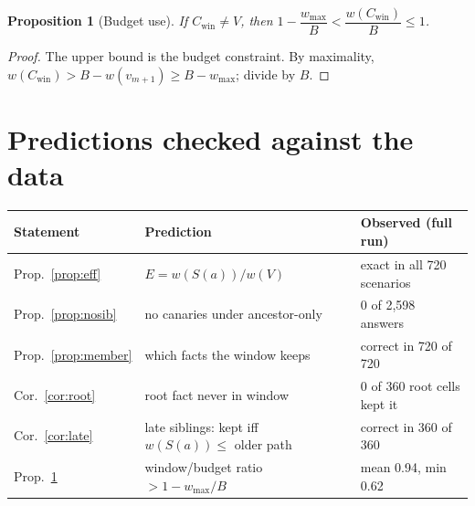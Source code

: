 \documentclass[11pt]{article}
\newtheorem{proposition}{Proposition}
\theoremstyle{definition}
\theoremstyle{remark}
\newcommand{\Sib}{S(a)}
\newcommand{\w}{w}
\newcommand{\win}{\mathrm{win}}
\begin{document}
\begin{proposition}[Budget use]\label{prop:ratio}
If $C_\win\neq V$, then $1-\dfrac{w_{\max}}{B}<\dfrac{\w(C_\win)}{B}\le 1$.
\end{proposition}
\begin{proof}
The upper bound is the budget constraint. By maximality,
$\w(C_\win)>B-\w(v_{m+1})\ge B-w_{\max}$; divide by $B$.
\end{proof}

\section{Predictions checked against the data}

\begin{center}
\begin{tabular}{@{}lll@{}}
\toprule
Statement & Prediction & Observed (full run) \\
\midrule
Prop.~\ref{prop:eff} & $E=\w(\Sib)/\w(V)$ & exact in all 720 scenarios \\
Prop.~\ref{prop:nosib} & no canaries under ancestor-only & 0 of 2{,}598 answers \\
Prop.~\ref{prop:member} & which facts the window keeps & correct in 720 of 720 \\
Cor.~\ref{cor:root} & root fact never in window & 0 of 360 root cells kept it \\
Cor.~\ref{cor:late} & late siblings: kept iff $\w(\Sib)\le$ older path & correct in 360 of 360 \\
Prop.~\ref{prop:ratio} & window/budget ratio $>1-w_{\max}/B$ & mean 0.94, min 0.62 \\
\bottomrule
\end{tabular}
\end{center}
\end{document}
